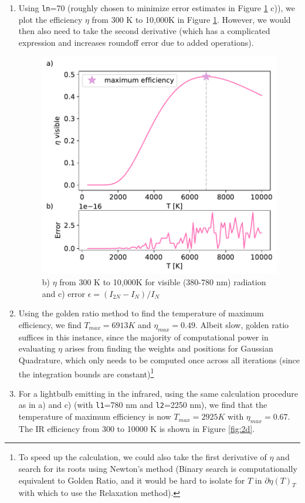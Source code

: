 \documentclass{article}
\newcommand{\code}{\texttt}
\begin{document}
\begin{enumerate}
\begin{enumerate}
  \item Using \code{ln}=70 (roughly chosen to minimize error estimates in Figure \ref{fig:2bc} c)), we plot the efficiency $\eta$ from 300 K to 10,000K in Figure \ref{fig:2bc}. 
  However, we would then also need to take the second derivative (which has a complicated expression and increases roundoff error due to added operations).
  \begin{figure}[H]
    \centering 
    \captionsetup{margin=3.2cm}
    \includegraphics[width=0.5\linewidth]{Q2bc.pdf}
    \caption{\label{fig:2bc} b) $\eta$ from 300 K to 10,000K for visible (380-780 nm) radiation and c) error $\epsilon=(I_{2N} - I_N)/I_N$}
  \end{figure}
  \item Using the golden ratio method to find the temperature of maximum efficiency, we find $T_{max}=6913 K$ and $\eta_{max}=0.49$. Albeit slow, golden ratio suffices in this instance, since the majority of computational power in evaluating $\eta$ arises from finding the weights and positions for Gaussian Quadrature, which only needs to be computed once across all iterations 
  (since the integration bounds are constant)\footnote{To speed up the calculation, we could also take the first derivative of $\eta$ and search for its roots using Newton's method (Binary search is computationally equivalent to Golden Ratio, and it would be hard to isolate for $T$ in $\partial\eta(T)_T$ with which to use the Relaxation method).}
  
  \item For a lightbulb emitting in the infrared, using the same calculation procedure as in a) and c) (with \code{l1}=780 nm and \code{l2}=2250 nm), we find that the temperature of maximum efficiency is now $T_{max}=2925 K$ with $\eta_{max}=0.67$. 
  The IR efficiency from 300 to 10000 K is shown in Figure \ref{fig:2d}.
  

\end{enumerate}
\end{enumerate}
\end{document}
